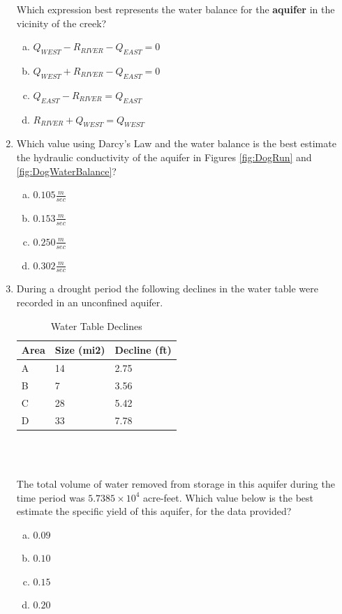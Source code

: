 \documentclass[12pt]{article}
\begin{document}
\begin{enumerate}
Which expression best represents the water balance for the \textbf{aquifer} in the vicinity of the creek?
\begin{enumerate}[a)]
\item $Q_{WEST} - R_{RIVER} - Q_{EAST} = 0$ 
\item $Q_{WEST} + R_{RIVER} - Q_{EAST} = 0$ %
\item $Q_{EAST} - R_{RIVER} =  Q_{EAST} $ 
\item $R_{RIVER} + Q_{WEST} = Q_{WEST} $ 
\end{enumerate}
\clearpage
\item Which value using Darcy's Law and the water balance is the best estimate the hydraulic conductivity of the aquifer in Figures \ref{fig:DogRun} and \ref{fig:DogWaterBalance}?

\begin{enumerate}[a)]
\item $0.105 \frac{m}{sec}$
\item $0.153 \frac{m}{sec}$
\item $0.250 \frac{m}{sec}$
\item $0.302 \frac{m}{sec}$
\end{enumerate}


\clearpage
\item During a drought period the following declines in the water table were recorded in an unconfined aquifer.\\
\begin{table}[htbp]
\centering
  \caption{Water Table Declines}
\begin{tabular}{p{1in}p{1in}p{1in}}
Area	& Size (mi2) & Decline (ft)\\
\hline
\hline
A&	14	&2.75\\
B&	7	&3.56\\
C	&28	&5.42\\
D	&33	&7.78\\
\hline
\end{tabular}\\
   \label{tab:booktabs}
\end{table}\\
The total volume of water removed from storage in this aquifer during the time period was $5.7385 \times 10^4$ acre-feet.  
Which value below is the best estimate the specific yield of this aquifer, for the data provided?
\begin{enumerate}[a)]
\item $0.09$
\item $0.10$
\item $0.15$
\item $0.20$ %
\end{enumerate}


\end{enumerate}
\end{document}
